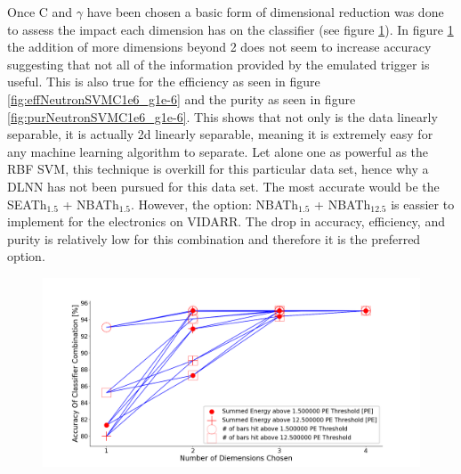 Once C and $\gamma$ have been chosen a basic form of dimensional reduction was done to assess the impact each dimension has on the classifier (see figure \ref{fig:accNeutronSVMC1e6_g1e-6}). In figure \ref{fig:accNeutronSVMC1e6_g1e-6} the addition of more dimensions beyond 2 does not seem to increase accuracy suggesting that not all of the information provided by the emulated trigger is useful. This is also true for the efficiency as seen in figure \ref{fig:effNeutronSVMC1e6_g1e-6} and the purity as seen in figure \ref{fig:purNeutronSVMC1e6_g1e-6}. This shows that not only is the data linearly separable, it is actually 2d linearly separable, meaning it is extremely easy for any machine learning algorithm to separate. Let alone one as powerful as the RBF SVM, this technique is overkill for this particular data set, hence why a DLNN has not been pursued for this data set. The most accurate would be the SEATh$_{1.5}$ + NBATh$_{1.5}$. However, the option: NBATh$_{1.5}$ + NBATh$_{12.5}$ is eassier to implement for the electronics on VIDARR. The drop in accuracy, efficiency, and purity is relatively low for this combination and therefore it is the preferred option. 

\begin{figure}[!h]
\centering
\includegraphics[width=0.8\linewidth]{Chapter4/Figs/Raster/accNeutronSVMC1e6_g1e-6.png}
\label{fig:accNeutronSVMC1e6_g1e-6}
\end{figure}

